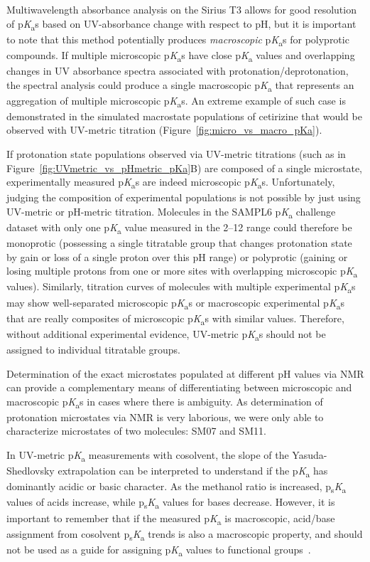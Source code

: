 \documentclass[9pt,lineno]{elife}
\newcommand{\pKa}{p\textit{K}\textsubscript{a}}
\newcommand{\psKa}{p\textsubscript{s}\textit{K}\textsubscript{a}}
\begin{document}
Multiwavelength absorbance analysis on the Sirius T3 allows for good resolution of \pKa{}s based on UV-absorbance change with respect to pH, but it is important to note that this method potentially produces \emph{macroscopic} \pKa{}s for polyprotic compounds. 
If multiple microscopic \pKa{}s have close \pKa{} values and overlapping changes in UV absorbance spectra associated with protonation/deprotonation, the spectral analysis could produce a single macroscopic \pKa{} that represents an aggregation of multiple microscopic \pKa{}s. 
An extreme example of such case is demonstrated in the simulated macrostate populations of cetirizine that would be observed with UV-metric titration (Figure~\ref{fig:micro_vs_macro_pKa}).

If protonation state populations observed via UV-metric titrations (such as in Figure~\ref{fig:UVmetric_vs_pHmetric_pKa}B) are composed of a single microstate, experimentally measured \pKa{}s are indeed microscopic \pKa{}s.  
Unfortunately, judging the composition of experimental populations is not possible by just using UV-metric or pH-metric titration. 
Molecules in the SAMPL6 \pKa{} challenge dataset with only one \pKa{} value measured in the 2--12 range could therefore be monoprotic (possessing a single titratable group that changes protonation state by gain or loss of a single proton over this pH range) or polyprotic (gaining or losing multiple protons from one or more sites with overlapping microscopic \pKa{} values). 
Similarly, titration curves of molecules with multiple experimental \pKa{}s may show well-separated microscopic \pKa{}s or macroscopic experimental \pKa{}s that are really composites of microscopic \pKa{}s with similar values. 
Therefore, without additional experimental evidence, UV-metric \pKa{}s should not be assigned to individual titratable groups. 

Determination of the exact microstates populated at different pH values via NMR can provide a complementary means of differentiating between microscopic and macroscopic \pKa{}s in cases where there is ambiguity.
As determination of protonation microstates via NMR is very laborious, we were only able to characterize microstates of two molecules: SM07 and SM11. 

In UV-metric \pKa{} measurements with cosolvent, the slope of the Yasuda-Shedlovsky extrapolation can be interpreted to understand if the \pKa{} has dominantly acidic or basic character. 
As the methanol ratio is increased, \psKa{} values of acids increase, while \psKa{} values for bases decrease. 
However, it is important to remember that if the measured \pKa{} is macroscopic, acid/base assignment from cosolvent \psKa{} trends is also a macroscopic property, and should not be used as a guide for assigning \pKa{} values to functional groups~\citep{fraczkiewicz_silico_2013}.
\end{document}
